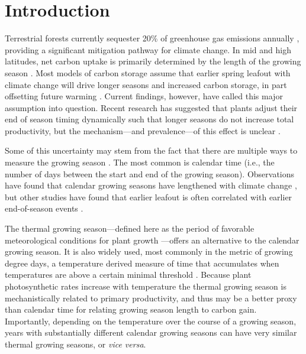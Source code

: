 \documentclass{article}[12pt]
\begin{document}
\section{Introduction}
Terrestrial forests currently sequester 20\% of greenhouse gas emissions annually  \citep{shanley2024, roe2021}, providing a significant mitigation pathway for climate change. In mid and high latitudes, net carbon uptake is primarily determined by the length of the growing season \citep{White1999}. Most models of carbon storage assume that earlier spring leafout with climate change will drive longer seasons and increased carbon storage, in part offsetting future warming \citep{Churkina2005,White1999,Keenan2014}. Current findings, however, have called this major assumption into question. Recent research has suggested that plants adjust their end of season timing dynamically such that longer seasons do not increase total productivity, but the mechanism---and prevalence---of this effect is unclear \citep{Zani2020,Norby2021,Zohner2023}.

Some of this uncertainty may stem from the fact that there are multiple ways to measure the growing season \citep{Korner2023}. The most common is calendar time (i.e., the number of days between the start and end of the growing season). Observations have found that calendar growing seasons have lengthened with climate change \citep{Menzel1999,Liu2010}, but other studies have found that earlier leafout is often correlated with earlier end-of-season events \citep{Zani2020,Liu2016,Keenan2015}. %

The thermal growing season---defined here as the period of favorable meteorological conditions for plant growth \citep{Korner2023}---offers an alternative to the calendar growing season. It is also widely used, most commonly in the metric of growing degree days, a temperature derived measure of time that accumulates when temperatures are above a certain minimal threshold \citep{CHUINE2000337,Moore:2014wl,YANG199561}. Because plant photosynthetic rates increase with temperature \citep{Farquhar:1980vm} the thermal growing season is mechanistically related to primary productivity, and thus may be a better proxy than calendar time for relating growing season length to carbon gain. Importantly, depending on the temperature over the course of a growing season, years with substantially different calendar growing seasons can have very similar thermal growing seasons, or \emph{vice versa}.
\end{document}
